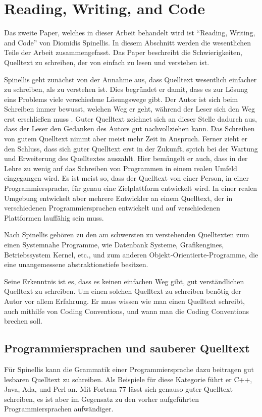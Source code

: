 \section{Reading, Writing, and Code}
Das zweite Paper, welches in dieser Arbeit behandelt wird ist \enquote{Reading, Writing, and Code} von Diomidis Spinellis\cite{Spinellis}. In diesem Abschnitt werden die wesentlichen Teile der Arbeit zusammengefasst. Das Paper beschreibt die Schwierigkeiten, Quelltext zu schreiben, der von einfach zu lesen und verstehen ist. 

Spinellis geht zunächst von der Annahme aus, dass Quelltext wesentlich einfacher zu schreiben, als zu verstehen ist. Dies begründet er damit, dass es zur Lösung eins Problems viele verschiedene Lösungswege gibt. Der Autor ist sich beim Schreiben immer bewusst, welchen Weg er geht, während der Leser sich den Weg erst erschließen muss \cite[S. 85]{Spinellis}. Guter Quelltext zeichnet sich an dieser Stelle dadurch aus, dass der Leser den Gedanken des Autors gut nachvollziehen kann. Das Schreiben von gutem Quelltext nimmt aber meist mehr Zeit in Anspruch. Ferner zieht er den Schluss, dass sich guter Quelltext erst in der Zukunft, sprich bei der Wartung und Erweiterung des Quelltextes auszahlt\cite[S. 86]{Spinellis}. Hier bemängelt er auch, dass in der Lehre zu wenig auf das Schreiben von Programmen in einem realen Umfeld eingegangen wird. Es ist meist so, dass der Quelltext von einer Person, in einer Programmiersprache, für genau eine Zielplattform entwickelt wird. In einer realen Umgebung entwickelt aber mehrere Entwickler an einem Quelltext, der in verschiedenen Programmiersprachen entwickelt und auf verschiedenen Plattformen lauffähig sein muss. \cite[S. 86]{Spinellis}

Nach Spinellis gehören zu den am schwersten zu verstehenden Quelltexten zum einen Systemnahe Programme, wie Datenbank Systeme, Grafikengines, Betriebssystem Kernel, etc., und zum anderen Objekt-Orientierte-Programme, die eine unangemessene abstraktionstiefe besitzen. \cite[S. 86]{Spinellis}

Seine Erkenntnis ist es, dass es keinen einfachen Weg gibt, gut verständlichen Quelltext zu schreiben. Um einen solchen Quelltext zu schreiben benötig der Autor vor allem Erfahrung. Er muss wissen wie man einen Quelltext schreibt, auch mithilfe von Coding Conventions, und wann man die Coding Conventions brechen soll. \cite[S. 86]{Spinellis}

\subsection{Programmiersprachen und sauberer Quelltext}
Für Spinellis kann die Grammatik einer Programmiersprache dazu beitragen gut lesbaren Quelltext zu schreiben. Als Beispiele für diese Kategorie führt er C++, Java, Ada, und Perl an. Mit Fortran 77 lässt sich genauso guter Quelltext schreiben, es ist aber im Gegensatz zu den vorher aufgeführten Programmiersprachen aufwändiger. \cite[S. 87]{Spinellis}

